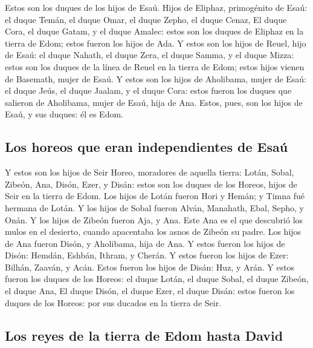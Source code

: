  Estos son los duques de los hijos de Esaú. Hijos de
Eliphaz, primogénito de Esaú: el duque Temán, el duque Omar, el duque
Zepho, el duque Cenaz,  El duque Cora, el duque Gatam, y el
duque Amalec: estos son los duques de Eliphaz en la tierra de Edom;
estos fueron los hijos de Ada.  Y estos son los hijos de
Reuel, hijo de Esaú: el duque Nahath, el duque Zera, el duque Samma, y
el duque Mizza: estos son los duques de la línea de Reuel en la tierra
de Edom; estos hijos vienen de Basemath, mujer de Esaú.  Y
estos son los hijos de Aholibama, mujer de Esaú: el duque Jeús, el duque
Jaalam, y el duque Cora: estos fueron los duques que salieron de
Aholibama, mujer de Esaú, hija de Ana.  Estos, pues, son
los hijos de Esaú, y sus duques: él es Edom.

\hypertarget{los-horeos-que-eran-independientes-de-esauxfa}{%
\subsection{Los horeos que eran independientes de
Esaú}\label{los-horeos-que-eran-independientes-de-esauxfa}}

 Y estos son los hijos de Seir Horeo, moradores de aquella
tierra: Lotán, Sobal, Zibeón, Ana,  Disón, Ezer, y Disán:
estos son los duques de los Horeos, hijos de Seir en la tierra de Edom.
 Los hijos de Lotán fueron Hori y Hemán; y Timna fué
hermana de Lotán.  Y los hijos de Sobal fueron Alván,
Manahath, Ebal, Sepho, y Onán.  Y los hijos de Zibeón
fueron Aja, y Ana. Este Ana es el que descubrió los mulos en el
desierto, cuando apacentaba los asnos de Zibeón su padre. 
Los hijos de Ana fueron Disón, y Aholibama, hija de Ana.  Y
estos fueron los hijos de Disón: Hemdán, Eshbán, Ithram, y Cherán.
 Y estos fueron los hijos de Ezer: Bilhán, Zaaván, y Acán.
 Estos fueron los hijos de Disán: Huz, y Arán.
 Y estos fueron los duques de los Horeos: el duque Lotán,
el duque Sobal, el duque Zibeón, el duque Ana,  El duque
Disón, el duque Ezer, el duque Disán: estos fueron los duques de los
Horeos: por sus ducados en la tierra de Seir.

\hypertarget{los-reyes-de-la-tierra-de-edom-hasta-david}{%
\subsection{Los reyes de la tierra de Edom hasta
David}\label{los-reyes-de-la-tierra-de-edom-hasta-david}}

